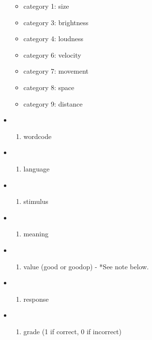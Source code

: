 \documentclass[
]{article}
\providecommand{\tightlist}{%
  \setlength{\itemsep}{0pt}\setlength{\parskip}{0pt}}
\begin{document}
\begin{itemize}
  \begin{itemize}
  \tightlist
  \item
    category 1: size
  \item
    category 3: brightness
  \item
    category 4: loudness
  \item
    category 6: velocity
  \item
    category 7: movement
  \item
    category 8: space
  \item
    category 9: distance
  \end{itemize}
\item
  \begin{enumerate}
  \def\labelenumi{\arabic{enumi}.}
  \setcounter{enumi}{4}
  \tightlist
  \item
    wordcode
  \end{enumerate}
\item
  \begin{enumerate}
  \def\labelenumi{\arabic{enumi}.}
  \setcounter{enumi}{5}
  \tightlist
  \item
    language
  \end{enumerate}
\item
  \begin{enumerate}
  \def\labelenumi{\arabic{enumi}.}
  \setcounter{enumi}{6}
  \tightlist
  \item
    stimulus
  \end{enumerate}
\item
  \begin{enumerate}
  \def\labelenumi{\arabic{enumi}.}
  \setcounter{enumi}{7}
  \tightlist
  \item
    meaning
  \end{enumerate}
\item
  \begin{enumerate}
  \def\labelenumi{\arabic{enumi}.}
  \setcounter{enumi}{8}
  \tightlist
  \item
    value (good or goodop) - *See note below.
  \end{enumerate}
\item
  \begin{enumerate}
  \def\labelenumi{\arabic{enumi}.}
  \setcounter{enumi}{9}
  \tightlist
  \item
    response
  \end{enumerate}
\item
  \begin{enumerate}
  \def\labelenumi{\arabic{enumi}.}
  \setcounter{enumi}{10}
  \tightlist
  \item
    grade (1 if correct, 0 if incorrect)
  \end{enumerate}
\end{itemize}
\end{document}
